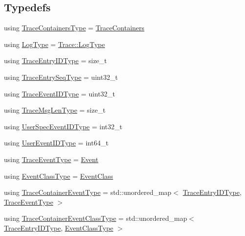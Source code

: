 \subsection*{Typedefs}
\begin{DoxyCompactItemize}
\item 
using \hyperlink{namespacevt_1_1trace_aaddb48ba5ca26191fce6c8565b662322}{Trace\+Containers\+Type} = \hyperlink{classvt_1_1trace_1_1_trace_containers}{Trace\+Containers}
\item 
using \hyperlink{namespacevt_1_1trace_a6e7b7f2c6cb0a14d5b01dde877174a71}{Log\+Type} = \hyperlink{structvt_1_1trace_1_1_trace_lite_aeb73e523d31829d3163c877b145afa2a}{Trace\+::\+Log\+Type}
\item 
using \hyperlink{namespacevt_1_1trace_a3c14050715ba9eceaeff51fb3de64f2f}{Trace\+Entry\+I\+D\+Type} = size\+\_\+t
\item 
using \hyperlink{namespacevt_1_1trace_a522028dd2a7d056f0ec3d417836fdecd}{Trace\+Entry\+Seq\+Type} = uint32\+\_\+t
\item 
using \hyperlink{namespacevt_1_1trace_a64a7185f3e102df8d8258f263ccd1582}{Trace\+Event\+I\+D\+Type} = uint32\+\_\+t
\item 
using \hyperlink{namespacevt_1_1trace_aeb598f45d67d41db7902e494f2f0ce59}{Trace\+Msg\+Len\+Type} = size\+\_\+t
\item 
using \hyperlink{namespacevt_1_1trace_a70c43e0e1596eea236912d4197d3120a}{User\+Spec\+Event\+I\+D\+Type} = int32\+\_\+t
\item 
using \hyperlink{namespacevt_1_1trace_a5908920d051c144c89f17c69ed262350}{User\+Event\+I\+D\+Type} = int64\+\_\+t
\item 
using \hyperlink{namespacevt_1_1trace_a79b7fa947245c08d04a3ea67fbff2c30}{Trace\+Event\+Type} = \hyperlink{structvt_1_1trace_1_1_event}{Event}
\item 
using \hyperlink{namespacevt_1_1trace_afc5456ac95b0d3e9bb63a21597f5660c}{Event\+Class\+Type} = \hyperlink{structvt_1_1trace_1_1_event_class}{Event\+Class}
\item 
using \hyperlink{namespacevt_1_1trace_a80118aaa48fed940af3899800bba2303}{Trace\+Container\+Event\+Type} = std\+::unordered\+\_\+map$<$ \hyperlink{namespacevt_1_1trace_a3c14050715ba9eceaeff51fb3de64f2f}{Trace\+Entry\+I\+D\+Type}, \hyperlink{namespacevt_1_1trace_a79b7fa947245c08d04a3ea67fbff2c30}{Trace\+Event\+Type} $>$
\item 
using \hyperlink{namespacevt_1_1trace_a352c8799ee88afa3f1b7008952ed8485}{Trace\+Container\+Event\+Class\+Type} = std\+::unordered\+\_\+map$<$ \hyperlink{namespacevt_1_1trace_a3c14050715ba9eceaeff51fb3de64f2f}{Trace\+Entry\+I\+D\+Type}, \hyperlink{namespacevt_1_1trace_afc5456ac95b0d3e9bb63a21597f5660c}{Event\+Class\+Type} $>$
\end{DoxyCompactItemize}
